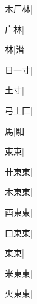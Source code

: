 \begin{multicols}{2}
{{\cjk{}木厂林}\mktsJzrVerticalBar{}{\cjk{}{\cnsym{}　}{\cnsym{}　}{\cnsym{}　}}|{}\par
{\cjk{}{\cnsym{}　}广林}\mktsJzrVerticalBar{}{\cjk{}{\cnsym{}　}{\cnsym{}　}{\cnsym{}　}}|{}\par
{林}\mktsJzrVerticalBar{}{\cjk{}{\cnsym{}　}{\cnsym{}　}{\cnsym{}　}}|{\cjk{}澘}\par
{\cjk{}日一寸}\mktsJzrVerticalBar{}{\cjk{}{\cnsym{}　}{\cnsym{}　}{\cnsym{}　}}|{}\par
{\cjk{}{\cnsym{}　}土寸}\mktsJzrVerticalBar{}{\cjk{}{\cnsym{}　}{\cnsym{}　}{\cnsym{}　}}|{}\par
{\cjk{}弓土匚}\mktsJzrVerticalBar{}{\cjk{}{\cnsym{}　}{\cnsym{}　}{\cnsym{}　}}|{}\par
{\cjk{}{\cnsym{}　}{\cnsym{}　}馬}\mktsJzrVerticalBar{}{\cjk{}{\cnsym{}　}{\cnsym{}　}{\cnsym{}　}}|{\cjk{}馹}\par
{\cjk{}{\cnsym{}　}東東}\mktsJzrVerticalBar{}{\cjk{}{\cnsym{}　}{\cnsym{}　}{\cnsym{}　}}|{}\par
{\cjk{}卄東東}\mktsJzrVerticalBar{}{\cjk{}{\cnsym{}　}{\cnsym{}　}{\cnsym{}　}}|{}\par
{\cjk{}木東東}\mktsJzrVerticalBar{}{\cjk{}{\cnsym{}　}{\cnsym{}　}{\cnsym{}　}}|{}\par
{\cjk{}酉東東}\mktsJzrVerticalBar{}{\cjk{}{\cnsym{}　}{\cnsym{}　}{\cnsym{}　}}|{}\par
{\cjk{}口東東}\mktsJzrVerticalBar{}{\cjk{}{\cnsym{}　}{\cnsym{}　}{\cnsym{}　}}|{}\par
{東東}\mktsJzrVerticalBar{}{\cjk{}{\cnsym{}　}{\cnsym{}　}{\cnsym{}　}}|{}\par
{\cjk{}米東東}\mktsJzrVerticalBar{}{\cjk{}{\cnsym{}　}{\cnsym{}　}{\cnsym{}　}}|{}\par
{\cjk{}火東東}\mktsJzrVerticalBar{}{\cjk{}{\cnsym{}　}{\cnsym{}　}{\cnsym{}　}}|{}\par
}
\end{multicols}

